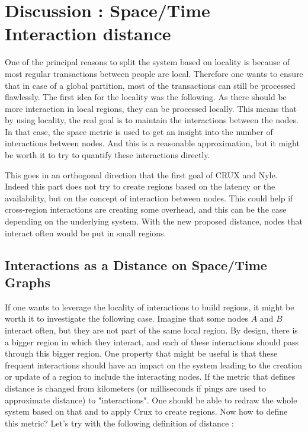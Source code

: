 \documentclass[a4paper,11pt,twoside=semi,openright]{report}
\begin{document}
\section{Discussion : Space/Time Interaction distance} One of the principal
reasons to split the system based on locality is because of most regular
transactions between people are local. Therefore one wants to ensure that in
case of a global partition, most of the transactions can still be processed
flawlessly. The first idea for the locality was the
following. As there should be more interaction in local regions, they can be
processed locally. This means that by using locality, the real goal is to
maintain the interactions between the nodes. In that case, the space metric is
used to get an insight into the number of interactions between nodes. And this
is a reasonable approximation, but it might be worth it to try to quantify
these interactions directly. 

This goes in an orthogonal direction that the first goal of CRUX and Nyle.
Indeed this part does not try to create regions based on the latency or the
availability, but on the concept of interaction between nodes. This could help
if cross-region interactions are creating some overhead, and this can be the
case depending on the underlying system. With the new proposed distance, nodes
that interact often would be put in small regions.

\subsection{Interactions as a Distance on Space/Time Graphs}

If one wants to leverage the locality of interactions to build regions, it
might be worth it to investigate the following case. Imagine that some nodes
$A$ and $B$ interact often, but they are not part of the same local region. By
design, there is a bigger region in which they interact, and each of these
interactions should pass through this bigger region. One property that might be
useful is that these frequent interactions should have an impact on the system
leading to the creation or update of a region to include the interacting nodes.
If the metric that defines distance is changed from kilometers (or milliseconds
if pings are used to approximate distance) to "interactions". One should be
able to redraw the whole system based on that and to apply Crux to create
regions. Now how to define this metric? Let's try with the following definition
of distance :
\end{document}
